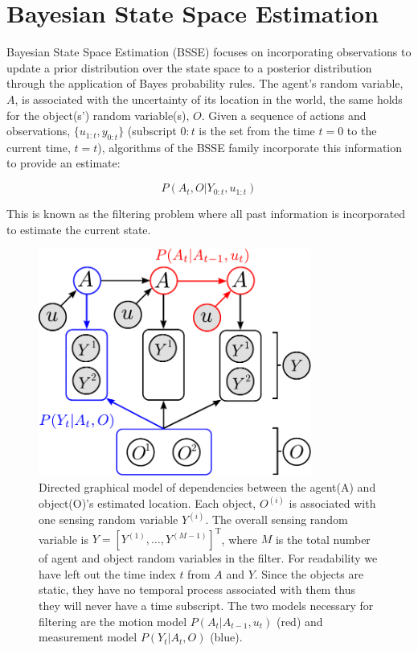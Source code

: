 \section{Bayesian State Space Estimation}\label{ch5:BSSE}

Bayesian State Space Estimation (BSSE) focuses on incorporating observations to update a prior distribution over
the state space to a posterior distribution through the application of Bayes probability rules. The agent's random variable, $A$, 
is associated with the uncertainty of its location in the world, the same holds for the object(s') random variable(s), $O$. 
Given a sequence of actions and observations, $\{u_{1:t},y_{0:t}\}$ (subscript $0:t$ is the set from the time $t=0$ to the current time, $t=t$), 
algorithms of the BSSE family incorporate this information to provide an estimate:

\begin{equation}
 P(A_t,O|Y_{0:t},u_{1:t}) 
 \label{eq:joint}
\end{equation}

This is known as the filtering problem where all past information is incorporated to estimate the current state.  

\begin{figure}
\centering
\includegraphics[width=0.8\textwidth]{./ch5-MLMF/Figures/Figure2.pdf}
\caption{Directed graphical model of dependencies between the agent(A) and object(O)'s estimated location. Each 
object, $O^{(i)}$ is associated with one sensing random variable $Y^{(i)}$. The overall sensing random variable is $Y = \left[Y^{(1)},\dots,Y^{(M-1)}\right]^{\mathrm{T}}$,
where $M$ is the total number of agent and object random variables in the filter. 
For readability we have left out the time index $t$ from $A$ and $Y$. Since the objects are static, they have no temporal process associated with 
them thus they will never have a time subscript. The two models necessary for filtering are the motion model $P(A_t|A_{t-1},u_t)$ (red) and measurement model
$P(Y_t|A_t,O)$ (blue).}
\label{fig:bayesian_sse_dag}
\end{figure}

